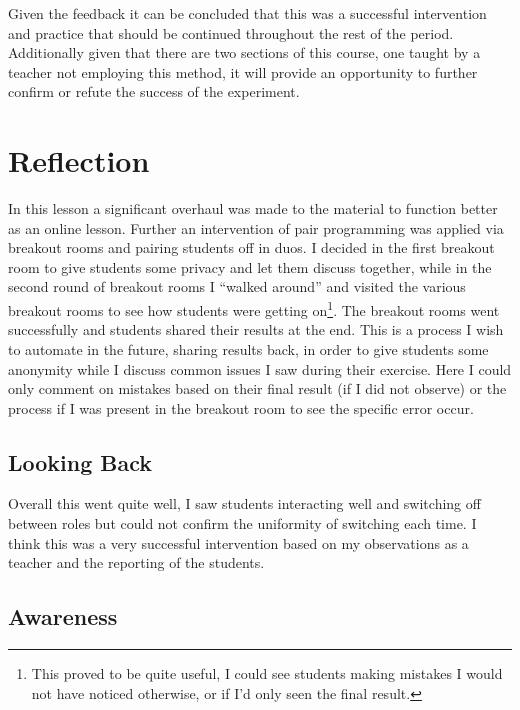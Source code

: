 \documentclass[paper=a4,justified,a4paper]{tufte-handout}
\begin{document}
Given the feedback it can be concluded that this was a successful
intervention and practice that should be continued throughout the rest
of the period. Additionally given that there are two sections of this
course, one taught by a teacher not employing this method, it will
provide an opportunity to further confirm or refute the success of the
experiment.

\hypertarget{reflection}{%
\section{Reflection}\label{reflection}}

In this lesson a significant overhaul was made to the material to
function better as an online lesson. Further an intervention of pair
programming was applied via breakout rooms and pairing students off in
duos. I decided in the first breakout room to give students some privacy
and let them discuss together, while in the second round of breakout
rooms I ``walked around'' and visited the various breakout rooms to see
how students were getting on\footnote{This proved to be quite useful, I
  could see students making mistakes I would not have noticed otherwise,
  or if I'd only seen the final result.}. The breakout rooms went
successfully and students shared their results at the end. This is a
process I wish to automate in the future, sharing results back, in order
to give students some anonymity while I discuss common issues I saw
during their exercise. Here I could only comment on mistakes based on
their final result (if I did not observe) or the process if I was
present in the breakout room to see the specific error occur.

\hypertarget{looking-back}{%
\subsection{Looking Back}\label{looking-back}}

Overall this went quite well, I saw students interacting well and
switching off between roles but could not confirm the uniformity of
switching each time. I think this was a very successful intervention
based on my observations as a teacher and the reporting of the students.

\hypertarget{awareness}{%
\subsection{Awareness}\label{awareness}}
\end{document}
